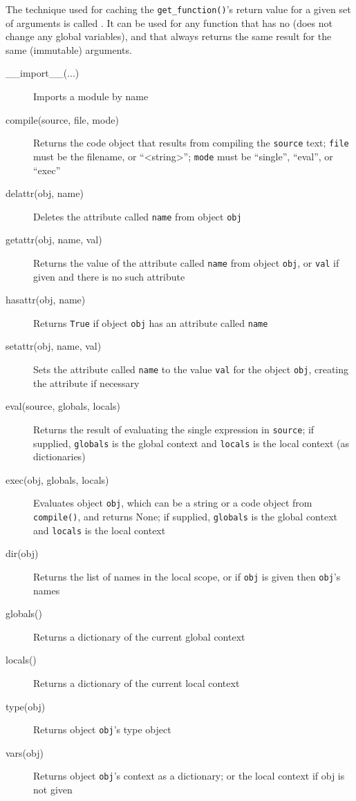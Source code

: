 The technique used for caching the \verb|get_function()|'s return value for a given set of arguments is called .
It can be used for any function that has no  (does not change any global variables), and
that always returns the same result for the same (immutable) arguments.

\newpage

\begin{tcolorbox}
\begin{description}
\item[\_{}\_{}import\_{}\_{}(...)] Imports a module by name
\item[compile(source, file, mode)] Returns the code object that results from compiling the \verb|source| text;
  \verb|file| must be the filename, or ``<string>'';
  \verb|mode| must be ``single'', ``eval'', or ``exec''
\item[delattr(obj, name)] Deletes the attribute called \verb|name| from object \verb|obj|
\item[getattr(obj, name, val)] Returns the value of the attribute called \verb|name| from object \verb|obj|,
  or \verb|val| if given and there is no such attribute
\item[hasattr(obj, name)] Returns \verb|True| if object \verb|obj| has an attribute called \verb|name|
\item[setattr(obj, name, val)] Sets the attribute called \verb|name| to the value \verb|val| for the object \verb|obj|,
  creating the attribute if necessary
\item[eval(source, globals, locals)] Returns the result of evaluating the single expression in \verb|source|;
  if supplied, \verb|globals| is the global context and
  \verb|locals| is the local context (as dictionaries)
\item[exec(obj, globals, locals)] Evaluates object \verb|obj|, which can be a string or a code object from \verb|compile()|,
  and returns None;
  if supplied, \verb|globals| is the global context and \verb|locals| is the local context
\item[dir(obj)] Returns the list of names in the local scope, or if \verb|obj| is given then \verb|obj|'s names
\item[globals()] Returns a dictionary of the current global context
\item[locals()] Returns a dictionary of the current local context
\item[type(obj)] Returns object \verb|obj|'s type object
\item[vars(obj)] Returns object \verb|obj|'s context as a dictionary;
  or the local context if obj is not given
\end{description}
\end{tcolorbox}


